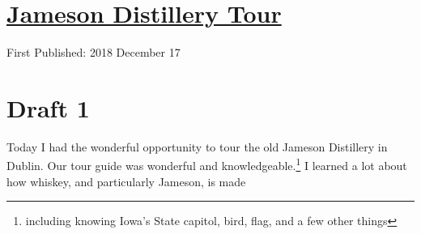 \documentclass[12pt]{article}[titlepage]
\newcommand{\1}{\={a}}
\newcommand{\2}{\={e}}
\newcommand{\3}{\={\i}}
\newcommand{\4}{\=o}
\newcommand{\5}{\=u}
\newcommand{\6}{\={A}}
\renewcommand{\,}{\textsuperscript{,}}
\begin{document}
\doublespacing
\section{\href{jameson-distillery.html}{Jameson Distillery Tour}}
First Published: 2018 December 17
\section{Draft 1}
Today I had the wonderful opportunity to tour the old Jameson Distillery in Dublin.
Our tour guide was wonderful and knowledgeable.\footnote{including knowing Iowa's State capitol, bird, flag, and a few other things}
I learned a lot about how whiskey, and particularly Jameson, is made
\end{document}
